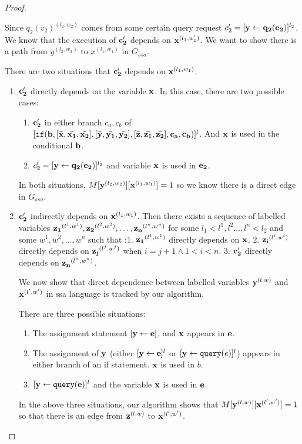 \documentclass[a4paper,11pt]{article}
\begin{document}
\begin{proof}
\begin{itemize}
\begin{enumerate}
\begin{enumerate}
 Since $q_2(v_2)^{(l_2,w_2)}$  comes from some certain query request $c_2' =[\mathrel{ \mathbf{{y}} \leftarrow \mathbf{{q_2(e_2)}} }]^{l_2}$. We know that the execution of $\mathbf{{c_2'}}$ depends on $\mathbf{{x}}^{(l_1,w_1')}$. We want to show there is a path from $ y^{(l_2,w_2)}$ to $x^{(l_1,w_1)}$ in $G_{ssa}$. 
 
 There are two situations that $\mathbf{{c_2'}}$ depends on $\mathbf{{x}}^{(l_1,w_1)}$.
 \begin{enumerate}
     \item $\mathbf{{c_2'}}$ directly depends on the variable $\mathbf{{x}}$. In this case, there are two possible cases: 
     \begin{enumerate}
         \item $\mathbf{{c_2'}}$ in either branch $c_a,c_b$ of $ [\mathtt{if}(\mathbf{{b}},[ \bar{\mathbf{{x}}}, \bar{\mathbf{{x_1}}}, \bar{\mathbf{{x_2}}}] ,[ \bar{\mathbf{{y}}}, \bar{\mathbf{{y_1}}}, \bar{\mathbf{{y_2}}}] , [ \bar{\mathbf{{z}}}, \bar{\mathbf{{z_1}}}, \bar{\mathbf{{z_2}}}] , \mathbf{{ c_a, c_b)}}]^{l} $. And  $\mathbf{{x}}$ is used in the conditional $\mathbf{{b}}$. 
         \item $c_2' =[\mathrel{ \mathbf{{y}} \leftarrow \mathbf{{q_2(e_2)}} }]^{l_2}$ and variable $\mathbf{{x}}$ is used in $\mathbf{{e_2}}$.
     \end{enumerate}
     In both situations,  $M[\mathbf{{y}}^{(l_2,w_2)}][\mathbf{{x}}^{(l_1,w_1)}] = 1$ so we know  there is a direct edge in $G_{ssa}$.
    \item $\mathbf{{c_2'}}$ indirectly depends on $\mathbf{{x}}^{(l_1,w_1)}$. Then there exists a sequence of labelled variables $\mathbf{{z_1}}^{(l^1,w^1)},\mathbf{{z_2}}^{(l^2,w^2)}, \ldots, \mathbf{{z_n}}^{(l^n,w^n)} $ for some $l_1<l^1 , l^2 \ldots, l^n < l_2$ and some $w^1, w^2, \ldots, w^n$ such that :1. $\mathbf{{z_1}}^{(l^1,w^1)}$ directly depends on $\mathbf{{x}}$. 2. $\mathbf{{z_i}}^{(l^i,w^i)}$ directly depends on $\mathbf{{z_j}}^{(l^j,w^j)}$ when $i = j+1 \land 1 <i < n $. 3. $\mathbf{{c_2'}}$ directly depends on $\mathbf{{z_n}}^{(l^n,w^n)}$. 
    
    We now show that direct dependence between labelled variables $\mathbf{{y}}^{(l,w)}$ and $\mathbf{{x}}^{(l',w')}$ in ssa language is tracked by our algorithm.
    
     There are three possible situations:
        \begin{enumerate}
            \item The assignment statement $ [\mathrel{ \mathbf{{y}} \leftarrow \mathbf{{e}} }] $, and $\mathbf{{x}}$ appears in $\mathbf{{e}}$.
            \item The assignment of $\mathbf{{y}}$ (either $[\mathrel{ \mathbf{{y}} \leftarrow \mathbf{{e}} }]^{l}$ or $[\mathrel{ \mathbf{{y}} \leftarrow {\tt query}(e) }]^{l}$) appears in either branch of an if statement. $\mathbf{{x}}$ is used in $b$.
            \item $ [\mathrel{ \mathbf{{y}} \leftarrow \mathbf{{{\tt query}(e)}} }]^{l}$ and the variable $\mathbf{{x}}$ is used in $\mathbf{{e}}$.  
        \end{enumerate}
        In the above three situations, our algorithm shows that $M[\mathbf{{y}}^{(l,w)}][\mathbf{{x}}^{(l',w')}] =1$ so that there is an edge from $\mathbf{{z}}^{(l,w)}$ to $\mathbf{{x}}^{(l', w')}$.  
           

\end{enumerate}
\end{enumerate}
\end{enumerate}
\end{itemize}
\end{proof}
\end{document}
